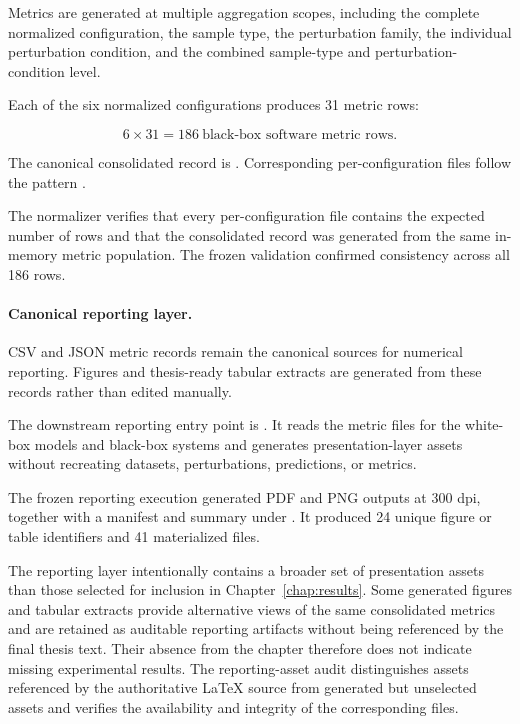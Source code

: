 Metrics are generated at multiple aggregation scopes, including the complete
normalized configuration, the sample type, the perturbation family, the
individual perturbation condition, and the combined sample-type and
perturbation-condition level.

Each of the six normalized configurations produces 31 metric rows:

\begin{equation}
6
\times
31
=
186\ \text{black-box software metric rows}.
\end{equation}

The canonical consolidated record is
. Corresponding
per-configuration files follow the pattern
.

The normalizer verifies that every per-configuration file contains the expected
number of rows and that the consolidated record was generated from the same
in-memory metric population. The frozen validation confirmed consistency
across all 186 rows.

\paragraph{Canonical reporting layer.}

CSV and JSON metric records remain the canonical sources for numerical
reporting. Figures and thesis-ready tabular extracts are generated from these
records rather than edited manually.

The downstream reporting entry point is
. It
reads the metric files for the white-box models and black-box systems and generates
presentation-layer assets without recreating datasets, perturbations,
predictions, or metrics.

The frozen reporting execution generated PDF and PNG outputs at 300 dpi,
together with a manifest and summary under
. It produced 24 unique figure or table
identifiers and 41 materialized files.

The reporting layer intentionally contains a broader set of presentation assets
than those selected for inclusion in Chapter~\ref{chap:results}. Some generated
figures and tabular extracts provide alternative views of the same consolidated
metrics and are retained as auditable reporting artifacts without being
referenced by the final thesis text. Their absence from the chapter therefore
does not indicate missing experimental results. The reporting-asset audit
distinguishes assets referenced by the authoritative \LaTeX{} source from
generated but unselected assets and verifies the availability and integrity of
the corresponding files.

